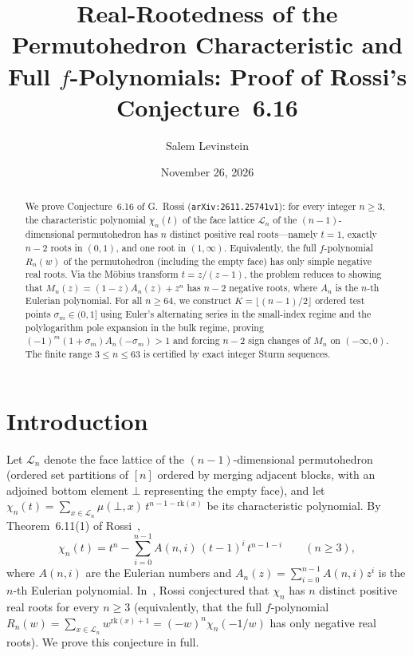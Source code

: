 \documentclass[11pt]{article}
\title{Real-Rootedness of the Permutohedron Characteristic and Full $f$-Polynomials: Proof of Rossi's Conjecture~6.16}
\author{Salem Levinstein}
\date{November 26, 2026}
\begin{document}
\maketitle

\begin{abstract}
We prove Conjecture~6.16 of G.~Rossi (\texttt{arXiv:2611.25741v1}): for every integer $n \ge 3$, the characteristic polynomial $\chi_n(t)$ of the face lattice $\mathcal{L}_n$ of the $(n - 1)$-dimensional permutohedron has $n$ distinct positive real roots---namely $t = 1$, exactly $n - 2$ roots in $(0, 1)$, and one root in $(1, \infty)$. Equivalently, the full $f$-polynomial $R_n(w)$ of the permutohedron (including the empty face) has only simple negative real roots. Via the Möbius transform $t = z / (z - 1)$, the problem reduces to showing that $M_n(z) = (1 - z) A_n(z) + z^n$ has $n - 2$ negative roots, where $A_n$ is the $n$-th Eulerian polynomial. For all $n \ge 64$, we construct $K = \lfloor (n - 1)/2 \rfloor$ ordered test points $\sigma_m \in (0, 1]$ using Euler's alternating series in the small-index regime and the polylogarithm pole expansion in the bulk regime, proving $(-1)^m (1 + \sigma_m) A_n(-\sigma_m) > 1$ and forcing $n - 2$ sign changes of $M_n$ on $(-\infty, 0)$. The finite range $3 \le n \le 63$ is certified by exact integer Sturm sequences.
\end{abstract}

\section{Introduction}

Let $\mathcal{L}_n$ denote the face lattice of the $(n - 1)$-dimensional permutohedron (ordered set partitions of $[n]$ ordered by merging adjacent blocks, with an adjoined bottom element $\bot$ representing the empty face), and let $\chi_n(t) = \sum_{x \in \mathcal{L}_n} \mu(\bot, x)\, t^{n - 1 - \mathrm{rk}(x)}$ be its characteristic polynomial. By Theorem~6.11(1) of Rossi~\cite{Rossi2026},
\begin{equation}\label{eq:chi}
  \chi_n(t) = t^n - \sum_{i=0}^{n-1} A(n, i)\, (t - 1)^i\, t^{n - 1 - i} \qquad (n \ge 3),
\end{equation}
where $A(n, i)$ are the Eulerian numbers and $A_n(z) = \sum_{i=0}^{n-1} A(n, i) z^i$ is the $n$-th Eulerian polynomial. In~\cite[Conjecture~6.16]{Rossi2026}, Rossi conjectured that $\chi_n$ has $n$ distinct positive real roots for every $n \ge 3$ (equivalently, that the full $f$-polynomial $R_n(w) = \sum_{x \in \mathcal{L}_n} w^{\mathrm{rk}(x) + 1} = (-w)^n \chi_n(-1/w)$ has only negative real roots). We prove this conjecture in full.
\end{document}
